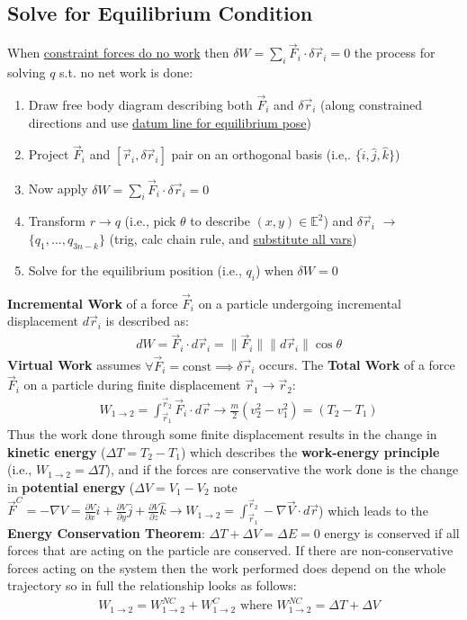 \documentclass[conference]{IEEEtran}
\begin{document}
\subsection{Solve for Equilibrium Condition}
When \underline{constraint forces do no work} then $\delta W = \sum_i \vec{F}_i \cdot \delta\vec{r}_i = 0$ the process for solving $q$ s.t. no net work is done:
\begin{enumerate}
    \item Draw free body diagram describing both $\vec{F}_i$ and $\delta \vec{r}_i$ (along constrained directions and use \underline{datum line for equilibrium pose})
    \item Project $\vec{F}_i$ and $[\vec{r}_i, \delta \vec{r}_i]$ pair on an orthogonal basis (i.e,. $\{\hat{i}, \hat{j}, \hat{k}\}$)
    \item Now apply $\delta W = \sum_i \vec{F}_i \cdot \delta \vec{r}_i = 0$
    \item Transform $r \to q$ (i.e., pick $\theta$ to describe $(x,y) \in \mathbb{E}^2$) and $\delta \vec{r}_i$ $\to$ $\{q_1, ..., q_{3n-k}\}$ (trig, calc chain rule, and \underline{substitute all vars})
    \item Solve for the equilibrium position (i.e., $q_i$) when $\delta W = 0$
\end{enumerate}
\textbf{Incremental Work} of a force $\vec{F}_i$ on a particle undergoing incremental displacement $d\vec{r}_i$ is described as:
\begin{align}
    & dW = \vec{F}_i \cdot d\vec{r}_i = \|\vec{F}_i\|\|d\vec{r}_i\|\cos\theta
\end{align}
\textbf{Virtual Work} assumes $\forall \vec{F}_i = \text{const} \implies \delta \vec{r}_i$ occurs. The \textbf{Total Work} of a force $\vec{F}_i$ on a particle during finite displacement $\vec{r}_1 \to \vec{r}_2$:
\begin{align}
    & W_{1 \to 2} = \int_{\vec{r}_1}^{\vec{r}_2} \vec{F}_i \cdot d\vec{r} \to \frac{m}{2} (v_2^2 - v_1^2) = (T_2 - T_1)
\end{align}
Thus the work done through some finite displacement results in the change in \textbf{kinetic energy} ($\Delta T = T_2 - T_1$) which describes the \textbf{work-energy principle} (i.e., $W_{1 \to 2} = \Delta T$), and if the forces are conservative the work done is the change in \textbf{potential energy} ($\Delta V = V_1 - V_2$ note $\vec{F}^C = -\nabla V = \frac{\partial V}{\partial x}\hat{i} + \frac{\partial V}{\partial y} \hat{j} + \frac{\partial V}{\partial z}\hat{k} \to W_{1 \to 2}=\int_{\vec{r}_1}^{\vec{r}_2}-\nabla \vec{V} \cdot d\vec{r}$) which leads to the \textbf{Energy Conservation Theorem}: $\Delta T + \Delta V = \Delta E = 0$ energy is conserved if all forces that are acting on the particle are conserved. If there are non-conservative forces acting on the system then the work performed does depend on the whole trajectory so in full the relationship looks as follows:
\begin{align}
    & W_{1 \to 2} = W_{1 \to 2}^{NC} + W_{1 \to 2}^{C} \text{ where } W_{1 \to 2}^{NC} = \Delta T + \Delta V
\end{align}
\end{document}
